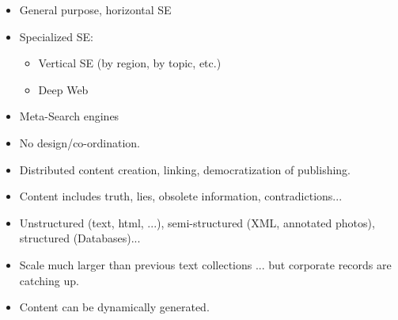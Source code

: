 \begin{breakbox}
\begin{itemize}
	\item General purpose, horizontal SE
	\item Specialized SE:
		\begin{itemize}
			\item Vertical SE (by region, by topic, etc.)
			\item Deep Web
		\end{itemize}
	\item Meta-Search engines
\end{itemize}
\end{breakbox}

\begin{breakbox}
\begin{itemize}
	\item No design/co-ordination.
	\item Distributed content creation, linking, democratization of publishing.
	\item Content includes truth, lies, obsolete information, contradictions...
	\item Unstructured (text, html, ...), semi-structured (XML, annotated photos), structured (Databases)...
	\item Scale much larger than previous text collections ... but corporate records are catching up.
	\item Content can be dynamically generated.
\end{itemize}
\end{breakbox}


